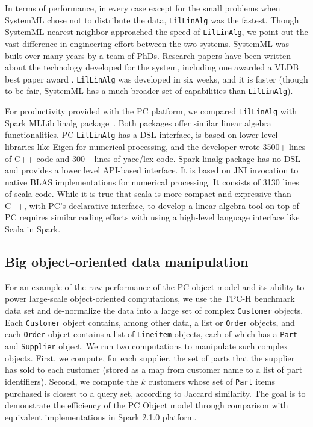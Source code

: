 In terms of performance, in every case except for the small problems when SystemML chose not to distribute the data,
\texttt{LilLinAlg} was the fastest.  
Though SystemML nearest neighbor approached the speed of 
\texttt{LilLinAlg}, we point out the vast difference in engineering effort between the two systems.  
SystemML was built over many years by a team of PhDs. Research papers have been written about the
technology developed for the system, including one awarded a VLDB best paper award \cite{boehm2016systemml}.
\texttt{LilLinAlg} was developed in six weeks, and it is faster (though to be fair, SystemML has a much broader
set of capabilities than \texttt{LilLinAlg}).

For productivity provided with the PC platform, we compared
\texttt{LilLinAlg} with Spark MLLib linalg
package~\cite{bosagh2016matrix}. Both packages offer similar linear algebra
functionalities. PC \texttt{LilLinAlg} has a DSL interface, is based on lower level
libraries like Eigen for numerical processing, and the developer 
wrote 3500+
lines of C++ code and 300+ lines of yacc/lex code. Spark linalg
package has no DSL and provides a lower level API-based interface. It
is based on JNI invocation to native BLAS implementations for
numerical processing. It consists of 3130 lines of scala
code. While it is true that scala is more compact and expressive
than C++, with PC's declarative interface, to develop a linear algebra
tool on top of PC requires similar coding efforts with using a
high-level language interface like Scala in Spark.



\subsection{Big object-oriented data manipulation}
For an example of the raw performance of the PC object model and its ability to power large-scale 
object-oriented computations, we use the TPC-H benchmark data set \cite{council2008tpc}
and de-normalize
the data into a large set of complex \texttt{Customer} objects. Each
\texttt{Customer} object contains, among
other data, a list
or \texttt{Order} objects, and each \texttt{Order} object contains a list of \texttt{Lineitem} objects,
each of which has a \texttt{Part} and \texttt{Supplier} object.  
We run two computations to manipulate such complex objects. First, we compute, for each supplier,
the set of parts that the supplier has sold to each customer (stored
as a map from customer name to a list of part identifiers).
Second, we compute the $k$ customers whose set of \texttt{Part} items purchased is closest to
a query set, according to Jaccard similarity.
The goal is to demonstrate the efficiency of the PC
Object model through comparison with equivalent implementations in Spark 2.1.0 platform.

